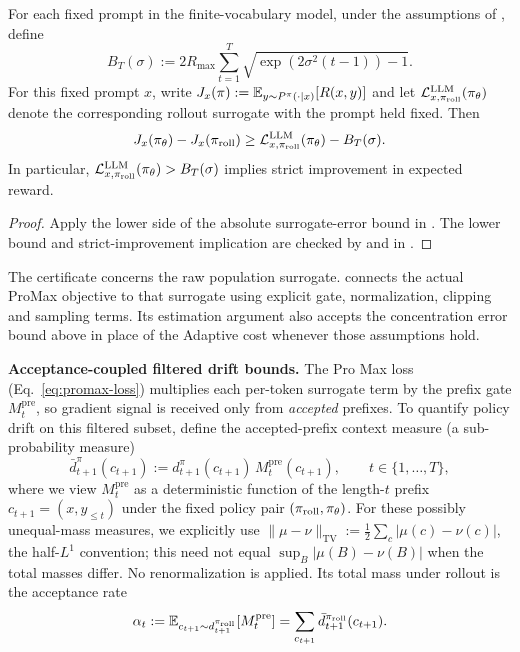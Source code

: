 \begin{corollary}
\label{cor:concentration-improvement}
For each fixed prompt in the finite-vocabulary model, under the assumptions of
, define
\[
    B_T(\sigma):=2R_{\max}\sum_{t=1}^{T}
        \sqrt{\exp(2\sigma^2(t-1))-1}.
\]
For this fixed prompt $x$, write
$J_x(\pi):=\mathbb{E}_{y\sim P^{\pi}(\cdot|x)}[R(x,y)]$ and let
$\mathcal{L}_{x,\pi_{\mathrm{roll}}}^{\mathrm{LLM}}(\pi_{\theta})$ denote the corresponding
rollout surrogate with the prompt held fixed. Then
\[
    J_x(\pi_{\theta})-J_x(\pi_{\mathrm{roll}})
    \ge \mathcal{L}_{x,\pi_{\mathrm{roll}}}^{\mathrm{LLM}}(\pi_{\theta})-B_T(\sigma).
\]
In particular, $\mathcal{L}_{x,\pi_{\mathrm{roll}}}^{\mathrm{LLM}}(\pi_{\theta})>B_T(\sigma)$
implies strict improvement in expected reward.
\end{corollary}
\begin{proof}
Apply the lower side of the absolute surrogate-error bound in
. The lower bound and strict-improvement
implication are checked by  and
 in .
\end{proof}
The certificate concerns the raw population surrogate.
 connects the actual ProMax objective to that
surrogate using explicit gate, normalization, clipping and sampling terms.
Its estimation argument also accepts the concentration error bound above
in place of the Adaptive cost whenever those assumptions hold.

\par
\noindent\textbf{Acceptance-coupled filtered drift bounds.}
The Pro Max loss (Eq.~\eqref{eq:promax-loss}) multiplies each per-token surrogate term by the prefix gate $M_t^{\mathrm{pre}}$, so gradient
signal is received only from \emph{accepted} prefixes. To quantify policy drift on this filtered subset, define the accepted-prefix context
measure (a sub-probability measure)
\begin{equation*}
    \bar{d}_{t+1}^{\pi}(c_{t+1})
    :=
    d_{t+1}^{\pi}(c_{t+1})\,M_t^{\mathrm{pre}}(c_{t+1}),
    \qquad
    t\in\{1,\ldots,T\},
\end{equation*}
where we view $M_t^{\mathrm{pre}}$ as a deterministic function of the length-$t$ prefix $c_{t+1}=(x,y_{\le t})$ under the fixed policy pair
$(\pi_{\mathrm{roll}},\pi_{\theta})$. For these possibly unequal-mass measures, we explicitly
use $\|\mu-\nu\|_{\mathrm{TV}}:=\tfrac12\sum_c|\mu(c)-\nu(c)|$,
the half-$L^1$ convention; this need not equal
$\sup_B|\mu(B)-\nu(B)|$ when the total masses differ. No renormalization is
applied. Its total mass under rollout is the acceptance rate
\begin{equation*}
    \alpha_t
    :=
    \mathbb{E}_{c_{t+1}\sim d_{t+1}^{\pi_{\mathrm{roll}}}}\!\left[M_t^{\mathrm{pre}}\right]
    =
    \sum_{c_{t+1}}\bar{d}_{t+1}^{\pi_{\mathrm{roll}}}(c_{t+1}).
\end{equation*}

